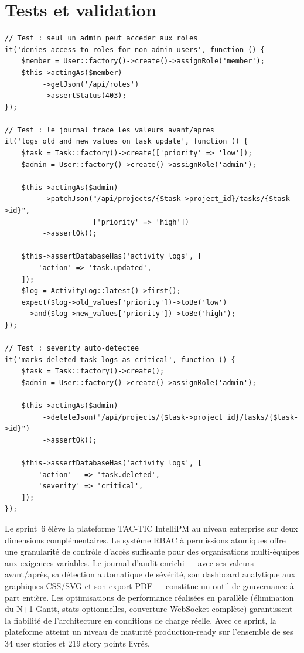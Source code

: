 \section{Tests et validation}

\begin{lstlisting}[style=phpstyle,caption={Tests unitaires — RBAC et journal d'audit},
  label={lst:tests_s6}]
// Test : seul un admin peut acceder aux roles
it('denies access to roles for non-admin users', function () {
    $member = User::factory()->create()->assignRole('member');
    $this->actingAs($member)
         ->getJson('/api/roles')
         ->assertStatus(403);
});

// Test : le journal trace les valeurs avant/apres
it('logs old and new values on task update', function () {
    $task = Task::factory()->create(['priority' => 'low']);
    $admin = User::factory()->create()->assignRole('admin');

    $this->actingAs($admin)
         ->patchJson("/api/projects/{$task->project_id}/tasks/{$task->id}",
                     ['priority' => 'high'])
         ->assertOk();

    $this->assertDatabaseHas('activity_logs', [
        'action' => 'task.updated',
    ]);
    $log = ActivityLog::latest()->first();
    expect($log->old_values['priority'])->toBe('low')
     ->and($log->new_values['priority'])->toBe('high');
});

// Test : severity auto-detectee
it('marks deleted task logs as critical', function () {
    $task = Task::factory()->create();
    $admin = User::factory()->create()->assignRole('admin');

    $this->actingAs($admin)
         ->deleteJson("/api/projects/{$task->project_id}/tasks/{$task->id}")
         ->assertOk();

    $this->assertDatabaseHas('activity_logs', [
        'action'   => 'task.deleted',
        'severity' => 'critical',
    ]);
});
\end{lstlisting}

\begin{chapconclusion}
Le sprint~6 élève la plateforme TAC-TIC IntelliPM au niveau enterprise sur deux
dimensions complémentaires. Le système RBAC à permissions atomiques offre une
granularité de contrôle d'accès suffisante pour des organisations multi-équipes
aux exigences variables. Le journal d'audit enrichi — avec ses valeurs avant/après,
sa détection automatique de sévérité, son dashboard analytique aux graphiques
CSS/SVG et son export PDF — constitue un outil de gouvernance à part entière.
Les optimisations de performance réalisées en parallèle (élimination du N+1 Gantt,
stats optionnelles, couverture WebSocket complète) garantissent la fiabilité de
l'architecture en conditions de charge réelle. Avec ce sprint, la plateforme
atteint un niveau de maturité production-ready sur l'ensemble de ses 34 user
stories et 219 story points livrés.
\end{chapconclusion}
